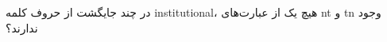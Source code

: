 \p    
در چند جایگشت از حروف کلمه
{\large institutional}،
 هیچ یک از عبارت‌های nt و tn وجود ندارند؟
